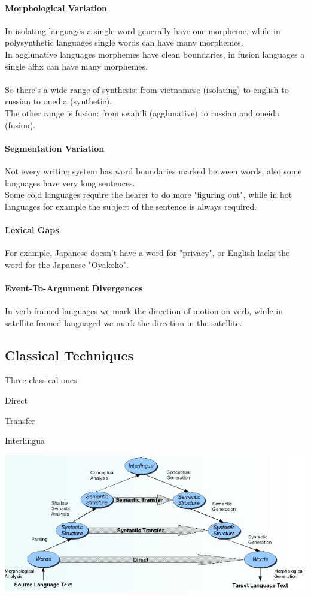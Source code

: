 \documentclass[10pt]{report}
\begin{document}
\paragraph{Morphological Variation}
In isolating languages a single word generally have one morpheme, while in polysynthetic languages single words can have many morphemes.\\
In agglunative languages morphemes have clean boundaries, in fusion languages a single affix can have many morphemes.\\\\
So there's a wide range of synthesis: from vietnamese (isolating) to english to russian to onedia (synthetic).\\
The other range is fusion: from swahili (agglunative) to russian and oneida (fusion).
\paragraph{Segmentation Variation} Not every writing system has word boundaries marked between words, also some languages have very long sentences.\\
Some cold languages require the hearer to do more "figuring out", while in hot languages for example the subject of the sentence is always required.
\paragraph{Lexical Gaps} For example, Japanese doesn't have a word for "privacy", or English lacks the word for the Japanese "Oyakoko".
\paragraph{Event-To-Argument Divergences} In verb-framed languages we mark the direction of motion on verb, while in satellite-framed languaged we mark the direction in the satellite.
\subsection{Classical Techniques} Three classical ones:\begin{list}{}{}
	\item Direct
	\item Transfer
	\item Interlingua
\end{list}
\begin{center}
	\includegraphics[scale=0.75]{41.png}
\end{center}
\end{document}
